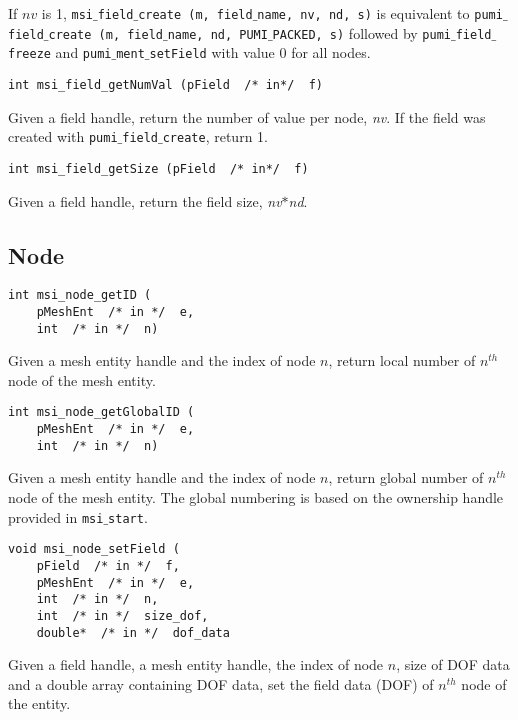  If $nv$ is 1, \texttt{msi$\_$field$\_$create (m, field$\_$name, nv, nd, s)} is equivalent to \texttt{pumi$\_$field$\_$create (m, field$\_$name, nd, PUMI$\_$PACKED, s)} followed by \texttt{pumi$\_$field$\_$freeze} and \texttt{pumi$\_$ment$\_$setField} with value $0$ for all nodes.

\begin{verbatim}
int msi_field_getNumVal (pField  /* in*/  f)
\end{verbatim}\vspace{-.5cm}\hspace{1cm}
Given a field handle, return the number of value per node, \textit{nv}. If the field was created with \texttt{pumi$\_$field$\_$create}, return 1.

\begin{verbatim}
int msi_field_getSize (pField  /* in*/  f)
\end{verbatim}\vspace{-.5cm}\hspace{1cm}
Given a field handle, return the field size, \textit{nv}$*$\textit{nd}.


\subsection{Node}
\begin{verbatim} 
int msi_node_getID (
    pMeshEnt  /* in */  e, 
    int  /* in */  n)
\end{verbatim}\vspace{-.5cm}\hspace{1cm}
Given a mesh entity handle and the index of node $n$, return local number of $n^{th}$ node of the mesh entity.

\begin{verbatim}
int msi_node_getGlobalID (
    pMeshEnt  /* in */  e, 
    int  /* in */  n)
\end{verbatim}\vspace{-.5cm}\hspace{1cm}
Given a mesh entity handle and the index of node $n$, return global number of $n^{th}$ node of the mesh entity.
The global numbering is based on the ownership handle provided in \texttt{msi$\_$start}.

\begin{verbatim}
void msi_node_setField (
    pField  /* in */  f, 
    pMeshEnt  /* in */  e, 
    int  /* in */  n,
    int  /* in */  size_dof, 
    double*  /* in */  dof_data
\end{verbatim}\vspace{-.5cm}\hspace{1cm}
Given a field handle, a mesh entity handle, the index of node $n$, size of DOF data and a double array containing DOF data, set the field data (DOF) of $n^{th}$ node of the entity. 

